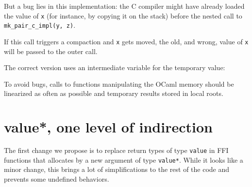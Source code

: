 \documentclass[a4paper]{easychair}
\begin{document}
\begin{Shaded}
\begin{Highlighting}[]
\NormalTok{\{}


\NormalTok{\}}
\end{Highlighting}
\end{Shaded}

But a bug lies in this implementation: the C compiler might have already
loaded the value of \texttt{x} (for instance, by copying it on the
stack) before the nested call to \texttt{mk\_pair\_c\_impl(y,\ z)}.

If this call triggers a compaction and \texttt{x} gets moved, the old,
and wrong, value of \texttt{x} will be passed to the outer call.

The correct version uses an intermediate variable for the temporary
value:

\begin{Shaded}
\begin{Highlighting}[]
\NormalTok{\{}


\NormalTok{\}}
\end{Highlighting}
\end{Shaded}

To avoid bugs, calls to functions manipulating the OCaml memory should
be linearized as often as possible and temporary results stored in local
roots.

\hypertarget{value-one-level-of-indirection}{%
\section{value*, one level of
indirection}\label{value-one-level-of-indirection}}

The first change we propose is to replace return types of type
\texttt{value} in FFI functions that allocates by a new argument of type
\texttt{value*}. While it looks like a minor change, this brings a lot
of simplifications to the rest of the code and prevents some undefined
behaviors.
\end{document}
